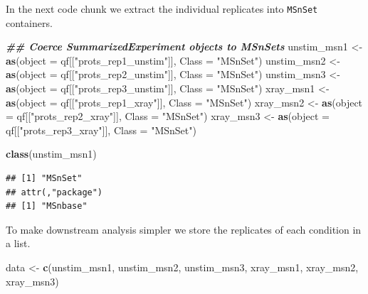 \documentclass[9pt,a4paper,]{extarticle}
\newenvironment{Shaded}{\begin{snugshade}}{\end{snugshade}}
\newcommand{\AttributeTok}[1]{\textcolor[rgb]{0.13,0.29,0.53}{#1}}
\newcommand{\DocumentationTok}[1]{\textcolor[rgb]{0.56,0.35,0.01}{\textbf{\textit{#1}}}}
\newcommand{\FunctionTok}[1]{\textcolor[rgb]{0.13,0.29,0.53}{\textbf{#1}}}
\newcommand{\NormalTok}[1]{#1}
\newcommand{\OtherTok}[1]{\textcolor[rgb]{0.56,0.35,0.01}{#1}}
\newcommand{\StringTok}[1]{\textcolor[rgb]{0.31,0.60,0.02}{#1}}
\begin{document}
In the next code chunk we extract the individual replicates into \texttt{MSnSet}
containers.

\begin{Shaded}
\begin{Highlighting}[]
\DocumentationTok{\#\# Coerce SummarizedExperiment objects to MSnSets}
\NormalTok{unstim\_msn1 }\OtherTok{\textless{}{-}} \FunctionTok{as}\NormalTok{(}\AttributeTok{object =}\NormalTok{ qf[[}\StringTok{"prots\_rep1\_unstim"}\NormalTok{]], }\AttributeTok{Class =} \StringTok{"MSnSet"}\NormalTok{)}
\NormalTok{unstim\_msn2 }\OtherTok{\textless{}{-}} \FunctionTok{as}\NormalTok{(}\AttributeTok{object =}\NormalTok{ qf[[}\StringTok{"prots\_rep2\_unstim"}\NormalTok{]], }\AttributeTok{Class =} \StringTok{"MSnSet"}\NormalTok{)}
\NormalTok{unstim\_msn3 }\OtherTok{\textless{}{-}} \FunctionTok{as}\NormalTok{(}\AttributeTok{object =}\NormalTok{ qf[[}\StringTok{"prots\_rep3\_unstim"}\NormalTok{]], }\AttributeTok{Class =} \StringTok{"MSnSet"}\NormalTok{)}
\NormalTok{xray\_msn1 }\OtherTok{\textless{}{-}} \FunctionTok{as}\NormalTok{(}\AttributeTok{object =}\NormalTok{ qf[[}\StringTok{"prots\_rep1\_xray"}\NormalTok{]], }\AttributeTok{Class =} \StringTok{"MSnSet"}\NormalTok{)}
\NormalTok{xray\_msn2 }\OtherTok{\textless{}{-}} \FunctionTok{as}\NormalTok{(}\AttributeTok{object =}\NormalTok{ qf[[}\StringTok{"prots\_rep2\_xray"}\NormalTok{]], }\AttributeTok{Class =} \StringTok{"MSnSet"}\NormalTok{)}
\NormalTok{xray\_msn3 }\OtherTok{\textless{}{-}} \FunctionTok{as}\NormalTok{(}\AttributeTok{object =}\NormalTok{ qf[[}\StringTok{"prots\_rep3\_xray"}\NormalTok{]], }\AttributeTok{Class =} \StringTok{"MSnSet"}\NormalTok{)}
\end{Highlighting}
\end{Shaded}

\begin{Shaded}
\begin{Highlighting}[]
\FunctionTok{class}\NormalTok{(unstim\_msn1)}
\end{Highlighting}
\end{Shaded}

\begin{verbatim}
## [1] "MSnSet"
## attr(,"package")
## [1] "MSnbase"
\end{verbatim}

To make downstream analysis simpler we store the replicates of each condition in
a list.

\begin{Shaded}
\begin{Highlighting}[]
\NormalTok{data }\OtherTok{\textless{}{-}} \FunctionTok{c}\NormalTok{(unstim\_msn1, unstim\_msn2, unstim\_msn3, }
\NormalTok{          xray\_msn1, xray\_msn2, xray\_msn3)}
\end{Highlighting}
\end{Shaded}
\end{document}
